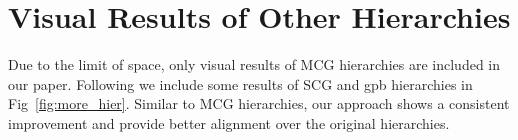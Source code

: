 \begin{table}
\begin{center}
\end{center}
\caption{Benchmark results of two different formulations.}
\label{tab:res_baseline}
\end{table}

\section{Visual Results of Other Hierarchies}
Due to the limit of space, only visual results of MCG hierarchies are included in our paper. Following we include some results of SCG and gpb hierarchies in Fig~\ref{fig:more_hier}.
Similar to MCG hierarchies, our approach shows a consistent improvement and provide better alignment over the original hierarchies. 

